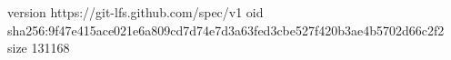 version https://git-lfs.github.com/spec/v1
oid sha256:9f47e415ace021e6a809cd7d74e7d3a63fed3cbe527f420b3ae4b5702d66c2f2
size 131168
